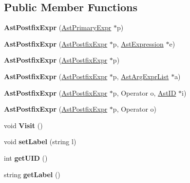 \subsection*{Public Member Functions}
\begin{DoxyCompactItemize}
\item 
\hypertarget{classAstPostfixExpr_a8299517f87239b0428545cdfc96f0bbc}{{\bfseries Ast\-Postfix\-Expr} (\hyperlink{classAstPrimaryExpr}{Ast\-Primary\-Expr} $\ast$p)}\label{classAstPostfixExpr_a8299517f87239b0428545cdfc96f0bbc}

\item 
\hypertarget{classAstPostfixExpr_a5dd762cbae8160f94a661ecdf3a90770}{{\bfseries Ast\-Postfix\-Expr} (\hyperlink{classAstPostfixExpr}{Ast\-Postfix\-Expr} $\ast$p, \hyperlink{classAstExpression}{Ast\-Expression} $\ast$e)}\label{classAstPostfixExpr_a5dd762cbae8160f94a661ecdf3a90770}

\item 
\hypertarget{classAstPostfixExpr_af17b325f38a7138728773d86a9342105}{{\bfseries Ast\-Postfix\-Expr} (\hyperlink{classAstPostfixExpr}{Ast\-Postfix\-Expr} $\ast$p)}\label{classAstPostfixExpr_af17b325f38a7138728773d86a9342105}

\item 
\hypertarget{classAstPostfixExpr_a4a1ae7a03b7b29e6641f47479e58aa3b}{{\bfseries Ast\-Postfix\-Expr} (\hyperlink{classAstPostfixExpr}{Ast\-Postfix\-Expr} $\ast$p, \hyperlink{classAstArgExprList}{Ast\-Arg\-Expr\-List} $\ast$a)}\label{classAstPostfixExpr_a4a1ae7a03b7b29e6641f47479e58aa3b}

\item 
\hypertarget{classAstPostfixExpr_a094735e6e2f593a42cc2b9aabc44213b}{{\bfseries Ast\-Postfix\-Expr} (\hyperlink{classAstPostfixExpr}{Ast\-Postfix\-Expr} $\ast$p, Operator o, \hyperlink{classAstID}{Ast\-I\-D} $\ast$i)}\label{classAstPostfixExpr_a094735e6e2f593a42cc2b9aabc44213b}

\item 
\hypertarget{classAstPostfixExpr_a71f3baa5264259031d95741e65de1e07}{{\bfseries Ast\-Postfix\-Expr} (\hyperlink{classAstPostfixExpr}{Ast\-Postfix\-Expr} $\ast$p, Operator o)}\label{classAstPostfixExpr_a71f3baa5264259031d95741e65de1e07}

\item 
\hypertarget{classAstPostfixExpr_ae3e7fdbd4c2bf888ee62760e6f422cad}{void {\bfseries Visit} ()}\label{classAstPostfixExpr_ae3e7fdbd4c2bf888ee62760e6f422cad}

\item 
\hypertarget{classAST_a71d680856e95ff89f55d5311a552eba6}{void {\bfseries set\-Label} (string l)}\label{classAST_a71d680856e95ff89f55d5311a552eba6}

\item 
\hypertarget{classAST_ab7a5b1d9f1c2de0d98deb356f724a42c}{int {\bfseries get\-U\-I\-D} ()}\label{classAST_ab7a5b1d9f1c2de0d98deb356f724a42c}

\item 
\hypertarget{classAST_aee029be902fffc927d16ccb03eb922ad}{string {\bfseries get\-Label} ()}\label{classAST_aee029be902fffc927d16ccb03eb922ad}

\end{DoxyCompactItemize}
